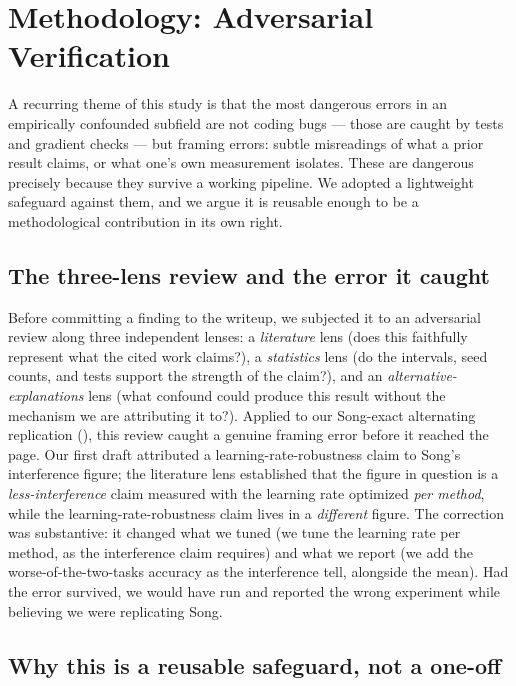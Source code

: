 \section{Methodology: Adversarial Verification}\label{sec:disc-adversarial}

A recurring theme of this study is that the most dangerous errors in an empirically confounded
subfield are not coding bugs --- those are caught by tests and gradient checks --- but framing
errors: subtle misreadings of what a prior result claims, or what one's own measurement isolates.
These are dangerous precisely because they survive a working pipeline. We adopted a lightweight
safeguard against them, and we argue it is reusable enough to be a methodological contribution in its
own right.

\subsection{The three-lens review and the error it caught}

Before committing a finding to the writeup, we subjected it to an adversarial review along three
independent lenses: a \emph{literature} lens (does this faithfully represent what the cited work
claims?), a \emph{statistics} lens (do the intervals, seed counts, and tests support the strength of
the claim?), and an \emph{alternative-explanations} lens (what confound could produce this result
without the mechanism we are attributing it to?). Applied to our Song-exact alternating replication
(), this review caught a genuine framing error before it reached the page. Our
first draft attributed a learning-rate-robustness claim to Song's interference figure; the literature
lens established that the figure in question is a \emph{less-interference} claim measured with the
learning rate optimized \emph{per method}, while the learning-rate-robustness claim lives in a
\emph{different} figure. The correction was substantive: it changed what we tuned (we tune the
learning rate per method, as the interference claim requires) and what we report (we add the
worse-of-the-two-tasks accuracy as the interference tell, alongside the mean). Had the error
survived, we would have run and reported the wrong experiment while believing we were replicating
Song.

\subsection{Why this is a reusable safeguard, not a one-off}

